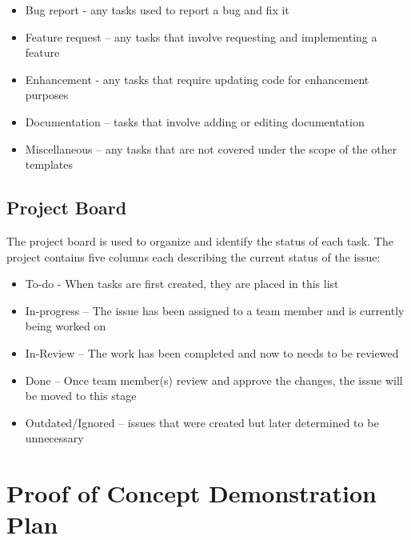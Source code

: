 \documentclass{article}
\begin{document}
\begin{itemize}
	\item Bug report - any tasks used to report a bug and fix it
	\item Feature request – any tasks that involve requesting and implementing a feature
	\item Enhancement - any tasks that require updating code for enhancement purposes
	\item Documentation – tasks that involve adding or editing documentation
	\item Miscellaneous – any tasks that are not covered under the scope of the other templates
\end{itemize}

\subsection{Project Board}
The project board is used to organize and identify the status of each task. 
The project contains five columns each describing the current status of the issue:

\begin{itemize}
	\item To-do - When tasks are first created, they are placed in this list
	\item In-progress – The issue has been assigned to a team member and is currently being worked on
	\item In-Review – The work has been completed and now to needs to be reviewed
	\item Done – Once team member(s) review and approve the changes, the issue will be moved to this stage
	\item Outdated/Ignored – issues that were created but later determined to be unnecessary 
\end{itemize}

\section{Proof of Concept Demonstration Plan}
\end{document}
